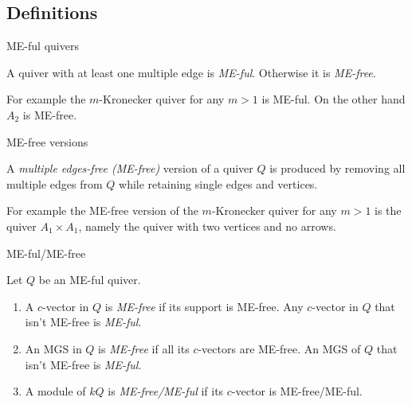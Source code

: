 \documentclass{beamer}
\begin{document}
\subsection{Definitions}

\begin{frame}{ME-ful quivers}
\begin{definition}
A quiver with at least one multiple edge is \textit{ME-ful}. Otherwise it is \textit{ME-free}.\pause
\end{definition}
\indent For example the $m$-Kronecker quiver for any $m > 1$ is ME-ful. On the other hand $A_2$ is ME-free.\\
\end{frame}

\begin{frame}{ME-free versions}
\begin{definition}
A \textit{multiple edges-free (ME-free)} version of a quiver $Q$ is produced by removing all multiple edges from $Q$ while retaining single edges and vertices.\pause
\end{definition}
\indent For example the ME-free version of the $m$-Kronecker quiver for any $m > 1$ is the quiver $A_1\times A_1$, namely the quiver with two vertices and no arrows.\\
\end{frame}

\begin{frame}{ME-ful/ME-free}
\begin{definition}
Let $Q$ be an ME-ful quiver.
\begin{enumerate}
\item A $c$-vector in $Q$ is \textit{ME-free} if its support is ME-free. Any $c$-vector in $Q$ that isn't ME-free is \textit{ME-ful}.
\item An MGS in $Q$ is \textit{ME-free} if all its $c$-vectors are ME-free. An MGS of $Q$ that isn't ME-free is \textit{ME-ful}.
\item A module of $kQ$ is \textit{ME-free/ME-ful} if its $c$-vector is ME-free/ME-ful.
\end{enumerate}
\end{definition}
\end{frame}
\end{document}
